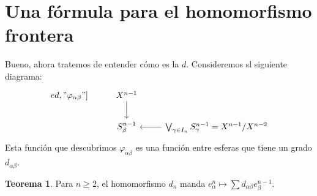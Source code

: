 \documentclass[spanish]{book}
\theoremstyle{definition}
\newtheorem*{teo}{Teorema}
\begin{document}
\section{Una fórmula para el homomorfismo frontera}
	Bueno, ahora tratemos de entender cómo es la $d$. Consideremos sl siguiente diagrama:
	\[\begin{tikzcd}
ed, "\varphi_{\alpha\beta}"] & X^{n-1} \arrow[d] \\
		& S^{n-1}_\beta & \bigvee_{\gamma\in I_n}S^{n-1}_\gamma = X^{n-1}/X^{n-2} \arrow[l]
	\end{tikzcd}\]
	Esta función que descubrimos $\varphi_{\alpha\beta}$ es una función entre esferas que tiene un grado $d_{\alpha\beta}$.
	\begin{teo}
		Para $n\geq 2$, el homomorfismo $d_n$ manda $e^{n}_\alpha\mapsto\sum d_{\alpha\beta}e^{n-1}_\beta$.
	\end{teo}
\end{document}
